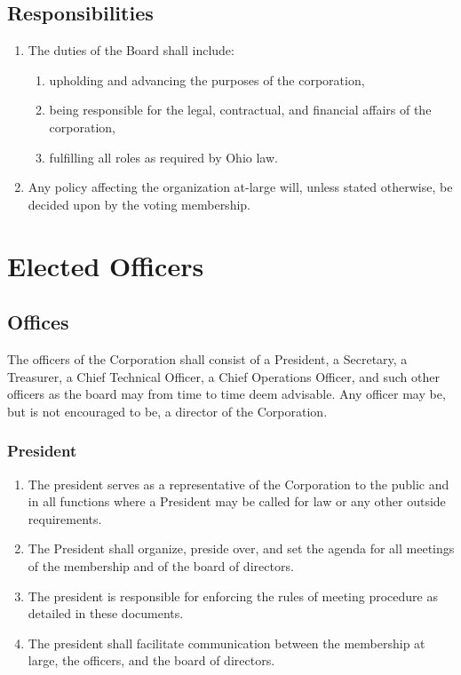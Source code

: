 \documentclass{article}
\begin{document}
\subsection{Responsibilities}
\begin{enumerate}
  \item The duties of the Board shall include:
  \begin{enumerate}
    \item upholding and advancing the purposes of the corporation,
    \item being responsible for the legal, contractual, and financial affairs of
    the corporation,
    \item fulfilling all roles as required by Ohio law.
  \end{enumerate}
  \item Any policy affecting the organization at-large will, unless stated
  otherwise, be decided upon by the voting membership.
\end{enumerate}
\section{Elected Officers}
  \subsection{Offices}
    The officers of the Corporation shall consist of a President, a Secretary, a Treasurer, a
    Chief Technical Officer, a Chief Operations Officer, and such other officers as the board
    may from time to time deem advisable.  Any officer may be, but is not encouraged to be, a
    director of the Corporation.
  \subsubsection{President}
    \begin{enumerate}
      \item The president serves as a representative of the Corporation to the public and in all
    functions where a President may be called for law or any other outside requirements.
      \item The President shall organize, preside over, and set the agenda for all meetings of
    the membership and of the board of directors.
      \item The president is responsible for enforcing the rules of meeting procedure as
    detailed in these documents.
      \item The president shall facilitate communication between the membership at large, the
    officers, and the board of directors.
    \end{enumerate}
\end{document}
